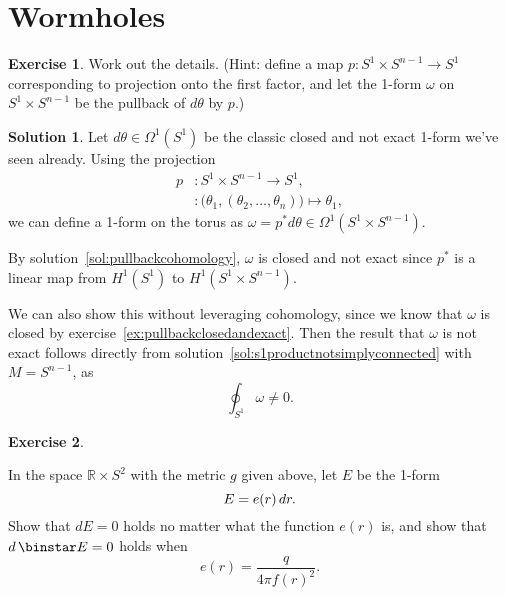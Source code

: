 \documentclass[11pt, a4paper]{report}
\theoremstyle{definition}
\newtheorem{exercise}{Exercise}[part]
\newtheorem{solution}{Solution}[part]
\newenvironment{ex}{\begin{exercise}}{\end{exercise}\pagebreak[1]}
\newenvironment{sol}{\begin{solution}}{\end{solution}\pagebreak[3]}
\newcommand*{\op}[1]{\ensuremath\mathop{}\mathopen{}#1}
\renewcommand*{\d}{\op{d}}
\renewcommand*{\star}{\op{\binstar}\mathord{}}
\begin{document}
\section{Wormholes}

\begin{ex}

Work out the details. (Hint: define a map $p: S^1 \times S^{n - 1} \to S^1$ corresponding to projection onto the first factor, and let the 1-form $\omega$ on $S^1 \times S^{n - 1}$ be the pullback of $d\theta$ by $p$.)

\end{ex}

\begin{sol}

Let $d\theta \in \Omega^1(S^1)$ be the classic closed and not exact 1-form we've seen already. Using the projection
\begin{align*}
    p &: S^1 \times S^{n - 1} \to S^1, \\
      &: \bigl( \theta_1, (\theta_2, \ldots, \theta_n) \bigr) \mapsto \theta_1,
\end{align*}
we can define a 1-form on the torus as $\omega = p^* d\theta \in \Omega^1(S^1 \times S^{n - 1})$.

By solution~\ref{sol:pullbackcohomology}, $\omega$ is closed and not exact since $p^*$ is a linear map from $H^1(S^1)$ to $H^1(S^1 \times S^{n - 1})$.

We can also show this without leveraging cohomology, since we know that $\omega$ is closed by exercise~\ref{ex:pullbackclosedandexact}. Then the result that $\omega$ is not exact follows directly from solution~\ref{sol:s1productnotsimplyconnected} with $M = S^{n - 1}$, as
\[
    \oint_{S^1} \omega \neq 0.
\]

\end{sol}

\begin{ex}\label{ex:vacuumelectrostaticwormhole}

In the space $\mathbb{R} \times S^2$ with the metric $g$ given above, let $E$ be the 1-form
\[
    E = e(r) \d r.
\]
Show that $dE = 0$ holds no matter what the function $e(r)$ is, and show that $d \star E = 0$ holds when
\[
    e(r) = \frac{q}{4 \pi {f(r)}^2}.
\]

\end{ex}
\end{document}

